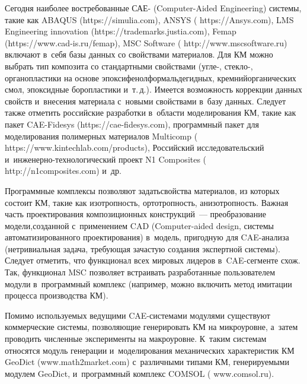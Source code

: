 \begin{multicols}{2}
     Сегодня наиболее востребованные САЕ- (Computer-Aided Engineering) 
сис\-те\-мы, такие как ABAQUS ({\sf https://simulia.com}), \mbox{ANSYS} ({\sf 
https://\linebreak Ansys.com}), LMS Engineering innovation ({\sf https://\linebreak trademarks.justia.com}), 
Femap ({\sf https://www.cad-is.ru/femap}), MSC Software ({\sf 
http://www.mscsoftware.\linebreak ru}) включают в~себя базы данных со свойствами 
материалов. Для КМ мож\-но выбрать тип композита со 
стандартными свойствами (угле-, стекло-, органопластики на основе 
эпоксифенолформальдегидных, кремнийорганических смол, эпоксидные 
боропластики и~т.\,д.). Имеется возможность коррекции данных свойств 
и~внесения материала с~новыми свойствами в~базу данных. Следует также отметить 
российские разработки в~об\-ласти моделирования КМ, 
такие как пакет CAE-Fidesys ({\sf https://cae-fidesys.com}), программный пакет для 
моделирования полимерных материалов Multicomp ({\sf 
https://www.kintechlab.com/products}), Российский исследовательский 
и~ин\-же\-нер\-но-тех\-но\-ло\-ги\-че\-ский проект N1 Composites ({\sf 
http://n1composites.com}) и~др.
{

}
     
     Программные комплексы позволяют задать\linebreak свойства материалов, из 
которых состоит КМ, такие как изотропность, 
ортотропность, анизотропность. Важная часть проектирования композиционных 
конструкций~--- преобразование модели,\linebreak созданной с~применением CAD 
(Computer-aided design, сис\-те\-мы автоматизированного проектирования) 
в~модель, пригодную для CAE-ана\-ли\-за (нетривиальная задача, тре\-бу\-ющая 
за\-час\-тую создания экспертной сис\-те\-мы). Следует отметить, что функционал всех 
мировых лидеров в~CAE-сег\-мен\-те схож. 
     Так, функционал MSC позволяет встраивать разработанные пользователем 
модули в~программный комплекс (например, можно включить метод имитации 
процесса производства КМ).
     
     Помимо используемых ведущими CAE-сис\-те\-ма\-ми модулями существуют 
коммерческие сис\-те\-мы, позволяющие генерировать КМ на микроуровне, а~затем 
проводить чис\-лен\-ные эксперименты на макроуровне. К~таким сис\-те\-мам 
относятся модуль генерации и~моделирования механических характеристик 
КМ GeoDict ({\sf www.math2market.com}) с~различными типами КМ, 
ге\-не\-ри\-ру\-емы\-ми модулем GeoDict, и~программный комплекс COMSOL ({\sf 
www.comsol.ru}).
     

\end{multicols}
